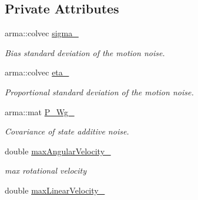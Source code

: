 \subsection*{Private Attributes}
\begin{DoxyCompactItemize}
\item 
\hypertarget{class_omnidirectional_motion_model_a8c823879250d4b39322c4e8ef69b68e6}{arma\-::colvec \hyperlink{class_omnidirectional_motion_model_a8c823879250d4b39322c4e8ef69b68e6}{sigma\-\_\-}}\label{class_omnidirectional_motion_model_a8c823879250d4b39322c4e8ef69b68e6}

\begin{DoxyCompactList}\small\item\em Bias standard deviation of the motion noise. \end{DoxyCompactList}\item 
\hypertarget{class_omnidirectional_motion_model_ab56f9e1467920bdfba8b425d74015812}{arma\-::colvec \hyperlink{class_omnidirectional_motion_model_ab56f9e1467920bdfba8b425d74015812}{eta\-\_\-}}\label{class_omnidirectional_motion_model_ab56f9e1467920bdfba8b425d74015812}

\begin{DoxyCompactList}\small\item\em Proportional standard deviation of the motion noise. \end{DoxyCompactList}\item 
\hypertarget{class_omnidirectional_motion_model_addd32ac4e3d1af518e48f432592c8e06}{arma\-::mat \hyperlink{class_omnidirectional_motion_model_addd32ac4e3d1af518e48f432592c8e06}{P\-\_\-\-Wg\-\_\-}}\label{class_omnidirectional_motion_model_addd32ac4e3d1af518e48f432592c8e06}

\begin{DoxyCompactList}\small\item\em Covariance of state additive noise. \end{DoxyCompactList}\item 
\hypertarget{class_omnidirectional_motion_model_ae84be708825d36f75a47ff1a6a112bf8}{double \hyperlink{class_omnidirectional_motion_model_ae84be708825d36f75a47ff1a6a112bf8}{max\-Angular\-Velocity\-\_\-}}\label{class_omnidirectional_motion_model_ae84be708825d36f75a47ff1a6a112bf8}

\begin{DoxyCompactList}\small\item\em max rotational velocity \end{DoxyCompactList}\item 
\hypertarget{class_omnidirectional_motion_model_a2e67cddfc94eedd6a7a9fe69207a4e6d}{double \hyperlink{class_omnidirectional_motion_model_a2e67cddfc94eedd6a7a9fe69207a4e6d}{max\-Linear\-Velocity\-\_\-}}\label{class_omnidirectional_motion_model_a2e67cddfc94eedd6a7a9fe69207a4e6d}


\end{DoxyCompactItemize}
